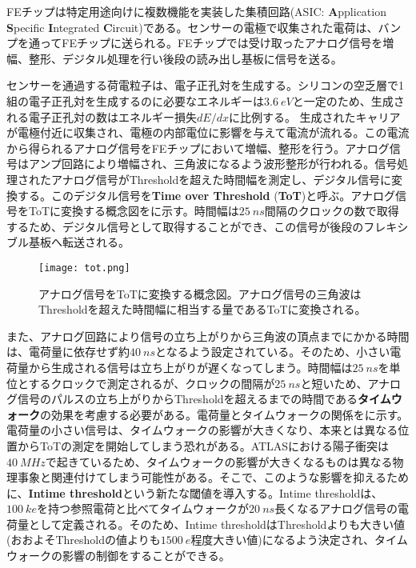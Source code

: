 FEチップは特定用途向けに複数機能を実装した集積回路(ASIC: \textbf{A}pplication \textbf{S}pecific \textbf{I}ntegrated \textbf{C}ircuit)である。センサーの電極で収集された電荷は、バンプを通ってFEチップに送られる。FEチップでは受け取ったアナログ信号を増幅、整形、デジタル処理を行い後段の読み出し基板に信号を送る。

センサーを通過する荷電粒子は、電子正孔対を生成する。シリコンの空乏層で1組の電子正孔対を生成するのに必要なエネルギーは$3.6\ \si{eV}$と一定のため、生成される電子正孔対の数はエネルギー損失$dE/dx$に比例する。
生成されたキャリアが電極付近に収集され、電極の内部電位に影響を与えて電流が流れる。この電流から得られるアナログ信号をFEチップにおいて増幅、整形を行う。アナログ信号はアンプ回路により増幅され、三角波になるよう波形整形が行われる。信号処理されたアナログ信号がThresholdを超えた時間幅を測定し、デジタル信号に変換する。このデジタル信号を\textbf{Time over Threshold} (\textbf{ToT})と呼ぶ。アナログ信号をToTに変換する概念図をに示す。時間幅は$25\ \si{ns}$間隔のクロックの数で取得するため、デジタル信号として取得することができ、この信号が後段のフレキシブル基板へ転送される。

\begin{figure}[tbp]
  \centering
  \texttt{[image: tot.png]}
  \caption[アナログ信号をToTに変換する概念図]{アナログ信号をToTに変換する概念図。アナログ信号の三角波はThresholdを超えた時間幅に相当する量であるToTに変換される。}
  \label{fig:tot}
\end{figure}

また、アナログ回路により信号の立ち上がりから三角波の頂点までにかかる時間は、電荷量に依存せず約$40\ \si{ns}$となるよう設定されている。そのため、小さい電荷量から生成される信号は立ち上がりが遅くなってしまう。時間幅は$25\ \si{ns}$を単位とするクロックで測定されるが、クロックの間隔が$25\ \si{ns}$と短いため、アナログ信号のパルスの立ち上がりからThresholdを超えるまでの時間である\textbf{タイムウォーク}の効果を考慮する必要がある。電荷量とタイムウォークの関係をに示す。電荷量の小さい信号は、タイムウォークの影響が大きくなり、本来とは異なる位置からToTの測定を開始してしまう恐れがある。ATLASにおける陽子衝突は$40\ \si{MHz}$で起きているため、タイムウォークの影響が大きくなるものは異なる物理事象と関連付けてしまう可能性がある。そこで、このような影響を抑えるために、\textbf{Intime threshold}という新たな閾値を導入する。Intime thresholdは、$100\ \si{ke}$を持つ参照電荷と比べてタイムウォークが$20\ \si{ns}$長くなるアナログ信号の電荷量として定義される。そのため、Intime thresholdはThresholdよりも大きい値(おおよそThresholdの値よりも$1500\ \si{e}$程度大きい値)になるよう決定され、タイムウォークの影響の制御をすることができる。


